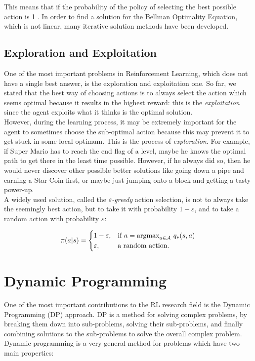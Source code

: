This means that if the probability of the policy of selecting the best possible action is 1 . In order to find a solution for the Bellman Optimality Equation, which is not linear, many iterative solution methods have been developed. 

\subsection{Exploration and Exploitation}
\label{sec:explorationExploitation}
One of the most important problems in Reinforcement Learning, which does not have a single best answer, is the exploration and exploitation one. So far, we stated that the best way of choosing actions is to always select the action which seems optimal because it results in the highest reward: this is the \textit{exploitation} since the agent exploits what it thinks is the optimal solution.
\\
\indent However, during the learning process, it may be extremely important for the agent to sometimes choose the sub-optimal action because this may prevent it to get stuck in some local optimum. This is the process of \textit{exploration}. For example, if Super Mario has to reach the end flag of a level, maybe he knows the optimal path to get there in the least time possible. However, if he always did so, then he would never discover other possible better solutions like going down a pipe and earning a Star Coin first, or maybe just jumping onto a block and getting a tasty power-up. 
\\
\indent A widely used solution, called the \textit{$\varepsilon$-greedy} action selection, is not to always take the seemingly best action, but to take it with probability $1 - \varepsilon$, and to take a random action with probability $\varepsilon$:

\begin{equation}
\pi(a|s) = \begin{cases}
1 - \varepsilon, & \text{if $a = \operatorname*{argmax}_{a \in \mathcal{A}} \, q_*(s,a)$}\\
\varepsilon, & \text{a random action}.
\end{cases}
\end{equation}

\section{Dynamic Programming}
One of the most important contributions to the RL research field is the Dynamic Programming (DP)\cite{bertsekas1995dynamic} approach. DP is a method for solving complex problems, by breaking them down into sub-problems, solving their sub-problems, and finally combining solutions to the sub-problems to solve the overall complex problem. Dynamic programming is a very general method for problems which have two main properties:

